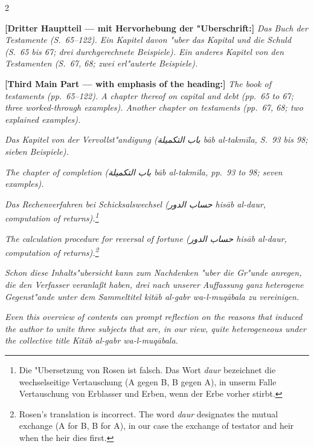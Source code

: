 \documentclass[10pt,a4paper]{article}
\newcommand{\RL}[1]{\beginR#1\endR}
\newcommand{\ar}[1]{{\arabicfont\RL{#1}}}
\begin{document}
\begin{paracol}{2}
\switchcolumn*

\textbf{[Dritter Hauptteil --- mit Hervorhebung der "Uberschrift:]} \textit{Das Buch der Testamente (S.\ 65--122). Ein Kapitel davon "uber das Kapital und die Schuld (S.\ 65 bis 67; drei durchgerechnete Beispiele). Ein anderes Kapitel von den Testamenten (S.\ 67, 68; zwei erl"auterte Beispiele).}

\switchcolumn

\textbf{[Third Main Part --- with emphasis of the heading:]} \textit{The book of testaments (pp.\ 65--122). A chapter thereof on capital and debt (pp.\ 65 to 67; three worked-through examples). Another chapter on testaments (pp.\ 67, 68; two explained examples).}

\switchcolumn*

\textit{Das Kapitel von der Vervollst"andigung (\ar{باب التكميلة} \textit{b\=ab al-takm\={i}la}, S.\ 93 bis 98; sieben Beispiele).}

\switchcolumn

\textit{The chapter of completion (\ar{باب التكميلة} \textit{b\=ab al-takm\={i}la}, pp.\ 93 to 98; seven examples).}

\switchcolumn*

\textit{Das Rechenverfahren bei Schicksalswechsel (\ar{حساب الدور} \textit{his\=ab al-daur}, \textit{computation of returns}).\footnote{Die "Ubersetzung von Rosen ist falsch. Das Wort \textit{daur} bezeichnet die wechselseitige Vertauschung (A gegen B, B gegen A), in unserm Falle Vertauschung von Erblasser und Erben, wenn der Erbe vorher stirbt.}}

\switchcolumn

\textit{The calculation procedure for reversal of fortune (\ar{حساب الدور} \textit{his\=ab al-daur}, \textit{computation of returns}).\footnote{Rosen's translation is incorrect. The word \textit{daur} designates the mutual exchange (A for B, B for A), in our case the exchange of testator and heir when the heir dies first.}}

\switchcolumn*

\textit{Schon diese Inhalts"ubersicht kann zum Nachdenken "uber die Gr"unde anregen, die den Verfasser veranla\ss{}t haben, drei nach unserer Auffassung ganz heterogene Gegenst"ande unter dem Sammeltitel \textit{kit\=ab al-gabr wa-l-muq\=abala} zu vereinigen.}

\switchcolumn

\textit{Even this overview of contents can prompt reflection on the reasons that induced the author to unite three subjects that are, in our view, quite heterogeneous under the collective title \textit{Kit\=ab al-gabr wa-l-muq\=abala}.}

\end{paracol}
\end{document}
